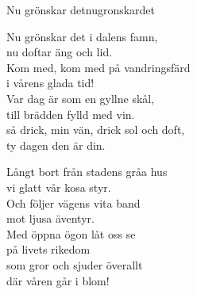 \begin{song}{Nu grönskar det}{nugronskardet}
\begin{vers}
Nu grönskar det i dalens famn, \\
nu doftar äng och lid.\\
Kom med, kom med på vandringsfärd\\
i vårens glada tid!\\
Var dag är som en gyllne skål,\\
till brädden fylld med vin.\\
så drick, min vän, drick sol och doft,\\
ty dagen den är din.\\
\end{vers}
\begin{vers}
Långt bort från stadens gråa hus \\
vi glatt vår kosa styr.\\
Och följer vägens vita band\\
mot ljusa äventyr.\\
Med öppna ögon låt oss se\\
på livets rikedom\\
som gror och sjuder överallt\\
där våren går i blom!\\
\end{vers}
\end{song}
